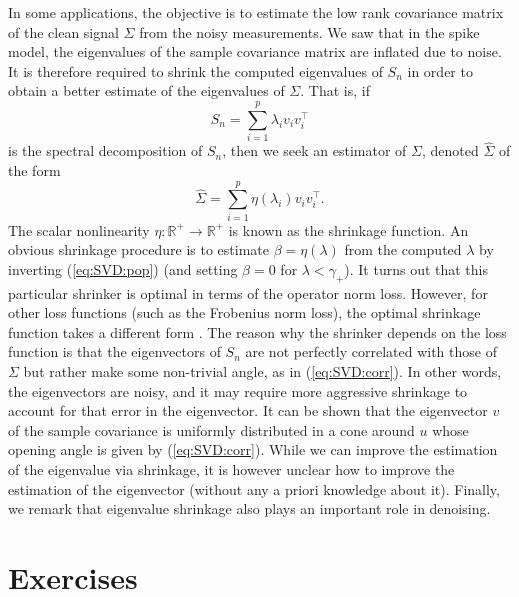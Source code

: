In some applications, the objective is to estimate the low rank covariance matrix of the clean signal $\Sigma$ from the noisy measurements. We saw that in the spike model, the eigenvalues of the sample covariance matrix are inflated due to noise. It is therefore required to shrink the computed eigenvalues of $S_n$ in order to obtain a better estimate of the eigenvalues of $\Sigma$. That is, if $$S_n = \sum_{i=1}^p \lambda_i v_i v_i^\top  $$ is the spectral decomposition of $S_n$, then we seek an estimator of $\Sigma$, denoted $\hat{\Sigma}$ of the form $$\hat{\Sigma} = \sum_{i=1}^p \eta(\lambda_i) v_i v_i^\top  .$$
The scalar nonlinearity $\eta : \mathbb{R}^+ \to \mathbb{R}^+$ is known as the shrinkage function.  An obvious shrinkage procedure is to estimate $\beta = \eta(\lambda)$ from the computed $\lambda$ by inverting (\ref{eq:SVD:pop}) (and setting $\beta=0$ for $\lambda < \gamma_{+}$). It turns out that this particular shrinker is optimal in terms of the operator norm loss. However, for other loss functions (such as the Frobenius norm loss), the optimal shrinkage function takes a different form \cite{donoho2018optimal}. The reason why the shrinker depends on the loss function is that the eigenvectors of $S_n$ are not perfectly correlated with those of $\Sigma$ but rather make some non-trivial angle, as in (\ref{eq:SVD:corr}). In other words, the eigenvectors are noisy, and it may require more aggressive shrinkage to account for that error in the eigenvector. It can be shown that the eigenvector $v$ of the sample covariance is uniformly distributed in a cone around $u$ whose opening angle is given by (\ref{eq:SVD:corr}). While we can improve the estimation of the eigenvalue via shrinkage, it is however unclear how to improve the estimation of the eigenvector (without any a priori knowledge about it). Finally, we remark that eigenvalue shrinkage also plays an important role in denoising.




















\section*{Exercises}

